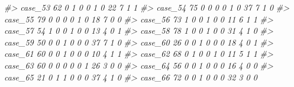 \documentclass[]{book}
\newenvironment{Shaded}{\begin{snugshade}}{\end{snugshade}}
\newcommand{\CommentTok}[1]{\textcolor[rgb]{0.56,0.35,0.01}{\textit{#1}}}
\begin{document}
\begin{Shaded}
\begin{Highlighting}[]
\CommentTok{#> case_53   62        0        1                0                 0                 1              0                    22                      7           1             1}
\CommentTok{#> case_54   75        0        0                0                 0                 1              0                    37                      7           1             0}
\CommentTok{#> case_55   79        0        0                0                 0                 1              0                    18                      7           0             0}
\CommentTok{#> case_56   73        1        0                0                 1                 0              0                    11                      6           1             1}
\CommentTok{#> case_57   54        1        0                0                 1                 0              0                    13                      4           0             1}
\CommentTok{#> case_58   78        1        0                0                 1                 0              0                    31                      4           1             0}
\CommentTok{#> case_59   50        0        0                1                 0                 0              0                    37                      7           1             0}
\CommentTok{#> case_60   26        0        0                1                 0                 0              0                    18                      4           0             1}
\CommentTok{#> case_61   60        0        0                1                 0                 0              0                    10                      4           1             1}
\CommentTok{#> case_62   68        0        1                0                 0                 1              0                    11                      5           1             1}
\CommentTok{#> case_63   60        0        0                0                 0                 0              1                    26                      3           0             0}
\CommentTok{#> case_64   56        0        0                1                 0                 0              0                    16                      4           0             0}
\CommentTok{#> case_65   21        0        1                1                 0                 0              0                    37                      4           1             0}
\CommentTok{#> case_66   72        0        0                1                 0                 0              0                    32                      3           0             0}

\end{Highlighting}
\end{Shaded}
\end{document}
